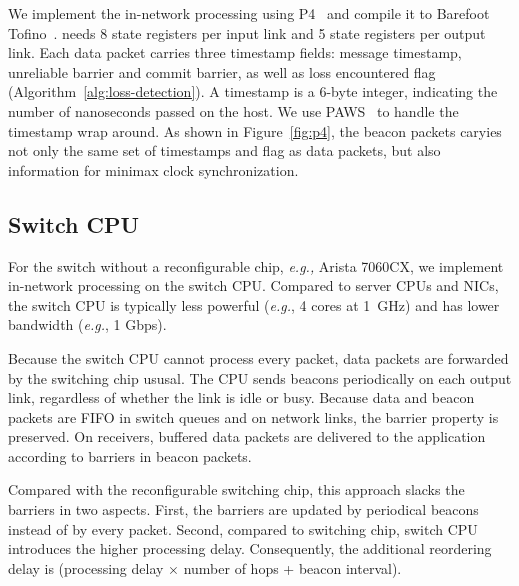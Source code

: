 We implement the in-network processing using P4~\cite{bosshart2014p4} and compile it to Barefoot Tofino~\cite{tofino}. \sys needs 8 state registers per input link and 5 state registers per output link. Each data packet carries three timestamp fields: message timestamp, unreliable barrier and commit barrier, as well as loss encountered flag (Algorithm~\ref{alg:loss-detection}).
A timestamp is a 6-byte integer, indicating the number of nanoseconds passed on the host. %
We use PAWS~\cite{jacobson1992tcp} to handle the timestamp wrap around.
As shown in Figure~\ref{fig:p4}, the beacon packets caryies not only the same set of timestamps and flag as data packets, but also information for minimax clock synchronization.

\subsection{Switch CPU}
\label{sec:commodity}

For the switch without a reconfigurable chip, \textit{e.g.,} Arista 7060CX, we implement in-network processing on the switch CPU. 
Compared to server CPUs and NICs, the switch CPU is typically less powerful (\textit{e.g.}, 4 cores at 1~GHz) and has lower bandwidth (\textit{e.g.}, 1 Gbps).

Because the switch CPU cannot process every packet, data packets are forwarded by the switching chip ususal. 
The CPU sends beacons periodically on each output link, regardless of whether the link is idle or busy.
Because data and beacon packets are FIFO in switch queues and on network links, the barrier property is preserved. On receivers, buffered data packets are delivered to the application according to barriers in beacon packets.

Compared with the reconfigurable switching chip, this approach slacks the barriers in two aspects.
First, the barriers are updated by periodical beacons instead of by every packet.
Second, compared to switching chip, switch CPU introduces the higher processing delay. Consequently, the additional reordering delay is (processing delay $\times$ number of hops + beacon interval).

